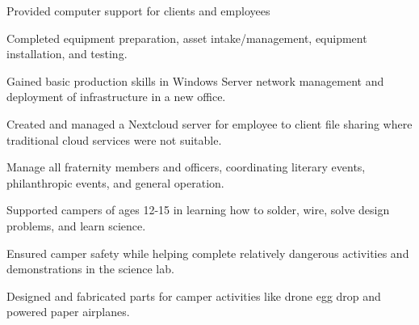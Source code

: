 \documentclass[]{deedy-resume-openfont}
\begin{document}
\begin{minipage}[t]{0.66\textwidth}
\vspace{\topsep} %
\begin{tightemize}
\item Provided computer support for clients and employees
\item Completed equipment preparation, asset intake/management, equipment installation, and testing.
\item Gained basic production skills in Windows Server network management and deployment of infrastructure in a new office.
\item Created and managed a Nextcloud server for employee to client file sharing where traditional cloud services were not suitable.
\end{tightemize}
\sectionsep

\vspace{\topsep} %
\begin{tightemize}
\item Manage all fraternity members and officers, coordinating literary events, philanthropic events, and general operation.
\end{tightemize}
\sectionsep

\vspace{\topsep} %
\begin{tightemize}
\item Supported campers of ages 12-15 in learning how to solder, wire, solve design problems, and learn science. 
\item Ensured camper safety while helping complete relatively dangerous activities and demonstrations in the science lab.
\item Designed and fabricated parts for camper activities like drone egg drop and powered paper airplanes.
 
\end{tightemize}
\sectionsep

\end{minipage}
\pagebreak

\end{document}
